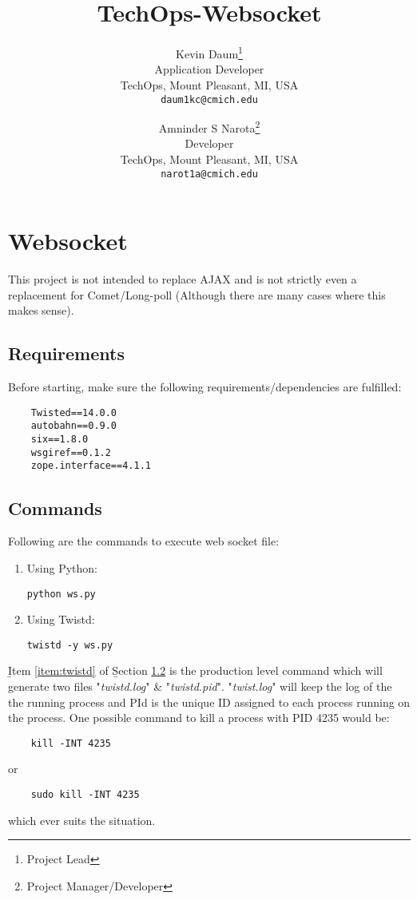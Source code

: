 \documentclass[12pt, titlepage, onecolumn]{article}
\title{TechOps-Websocket}
\author{
Kevin Daum\thanks{Project Lead}\\
\small Application Developer\\[-0.8ex]
\small TechOps, Mount Pleasant, MI, USA\\[-0.8ex]
\small \texttt{daum1kc@cmich.edu}\\
\and
Amninder S Narota\thanks{Project Manager/Developer}\\
\small Developer\\[-0.8ex]
\small TechOps, Mount Pleasant, MI, USA\\[-0.8ex]
\small \texttt{narot1a@cmich.edu}
}
\begin{document}
\maketitle


\section{Websocket}
This project is not intended to replace AJAX and is not strictly even a replacement for Comet/Long-poll (Although there are many cases where this makes sense).
\subsection{Requirements}
Before starting, make sure the following requirements/dependencies are fulfilled:
\begin{verbatim}
	Twisted==14.0.0
	autobahn==0.9.0
	six==1.8.0
	wsgiref==0.1.2
	zope.interface==4.1.1
\end{verbatim}

\subsection{Commands}
\label{sec:commands}
Following are the commands to execute web socket file:

\begin{enumerate}
	\item Using Python:
\begin{verbatim}
python ws.py
\end{verbatim}
	\item Using Twistd: 
	\label{item:twistd}
\begin{verbatim}
twistd -y ws.py

\end{verbatim}

\end{enumerate}
{\b Item \ref{item:twistd}} of {\b Section \ref{sec:commands}} is the production level command which will generate two files "\emph{twistd.log}" \& "\emph{twistd.pid}". "\emph{twist.log}" will keep the log of the the running process and PId is the unique ID assigned to each process running on the process. One possible command to kill a process with PID 4235 would be:
\begin{verbatim}
	kill -INT 4235
\end{verbatim}
or
\begin{verbatim}
	sudo kill -INT 4235
\end{verbatim}
which ever suits the situation.
\end{document}
